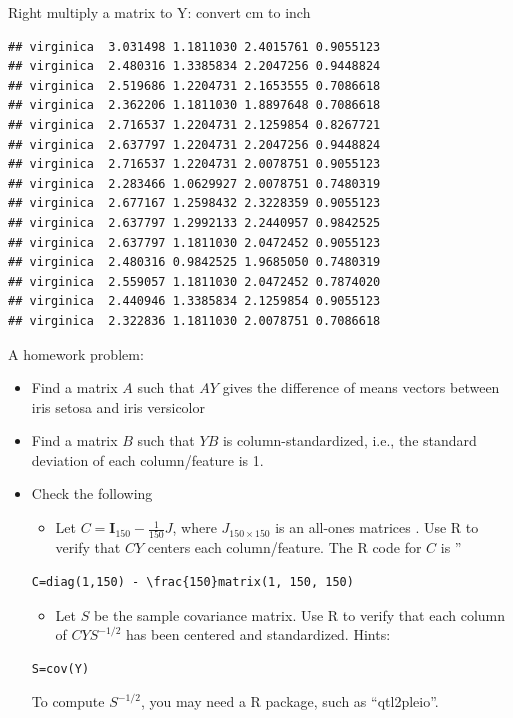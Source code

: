 \documentclass[
  ignorenonframetext,
]{beamer}
\providecommand{\tightlist}{%
  \setlength{\itemsep}{0pt}\setlength{\parskip}{0pt}}
\begin{document}
\begin{frame}[fragile]{Right multiply a matrix to Y: convert cm to inch}
\begin{verbatim}
## virginica  3.031498 1.1811030 2.4015761 0.9055123
## virginica  2.480316 1.3385834 2.2047256 0.9448824
## virginica  2.519686 1.2204731 2.1653555 0.7086618
## virginica  2.362206 1.1811030 1.8897648 0.7086618
## virginica  2.716537 1.2204731 2.1259854 0.8267721
## virginica  2.637797 1.2204731 2.2047256 0.9448824
## virginica  2.716537 1.2204731 2.0078751 0.9055123
## virginica  2.283466 1.0629927 2.0078751 0.7480319
## virginica  2.677167 1.2598432 2.3228359 0.9055123
## virginica  2.637797 1.2992133 2.2440957 0.9842525
## virginica  2.637797 1.1811030 2.0472452 0.9055123
## virginica  2.480316 0.9842525 1.9685050 0.7480319
## virginica  2.559057 1.1811030 2.0472452 0.7874020
## virginica  2.440946 1.3385834 2.1259854 0.9055123
## virginica  2.322836 1.1811030 2.0078751 0.7086618
\end{verbatim}
\end{frame}

\begin{frame}[fragile]{A homework problem:}
\protect\hypertarget{a-homework-problem}{}
\begin{itemize}
\tightlist
\item
  Find a matrix \(A\) such that \(AY\) gives the difference of means
  vectors between iris setosa and iris versicolor
\item
  Find a matrix \(B\) such that \(YB\) is column-standardized, i.e., the
  standard deviation of each column/feature is 1.
\item
  Check the following

  \begin{itemize}
  \tightlist
  \item
    Let \(C=\mathbf I_{150} - \frac{1}{150}J\), where
    \(J_{150\times 150}\) is an all-ones matrices . Use R to verify that
    \(CY\) centers each column/feature. The R code for \(C\) is ''
  \end{itemize}

\begin{verbatim}
C=diag(1,150) - \frac{150}matrix(1, 150, 150)
\end{verbatim}

  \begin{itemize}
  \tightlist
  \item
    Let \(S\) be the sample covariance matrix. Use R to verify that each
    column of \(CYS^{-1/2}\) has been centered and standardized. Hints:
  \end{itemize}

\begin{verbatim}
S=cov(Y)
\end{verbatim}

  To compute \(S^{-1/2}\), you may need a R package, such as
  ``qtl2pleio''.
\end{itemize}
\end{frame}
\end{document}
